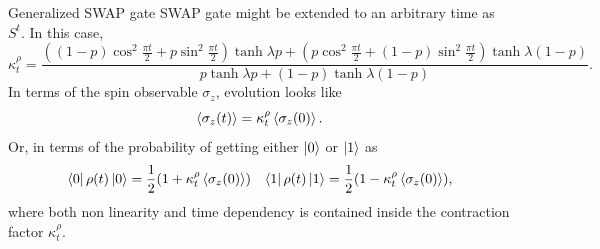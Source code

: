 \begin{frame}{Generalized SWAP gate}
    SWAP gate might be extended to an arbitrary time as $S^{t}$. In this case, 
    \begin{equation*}
        \kappa_{t}^{\rho}=\frac{((1-p)\cos^{2}{\frac{\pi t}{2}}+p\sin^{2}{\frac{\pi t}{2}})\tanh{\lambda p}+(p\cos^{2}{\frac{\pi t}{2}}+(1-p)\sin^{2}{\frac{\pi t}{2}})\tanh{\lambda (1-p)}}{
          p\tanh{\lambda p}+(1-p)\tanh{\lambda (1-p)}}.
      \end{equation*}
      In terms of the spin observable $\sigma_{z}$, evolution looks like
\begin{equation}
  \expval{\sigma_{z}(t)}=\kappa_{t}^{\rho}\expval{\sigma_{z}(0)}.
\end{equation}
Or, in terms of the probability of getting either $\ket{0}$ or $\ket{1}$ as
 \begin{align}
  \bra{0}\rho(t)\ket{0}=\frac{1}{2}(1+\kappa_{t}^{\rho}\expval{\sigma_{z}(0)}) && \bra{1}\rho(t)\ket{1}=\frac{1}{2}(1-\kappa_{t}^{\rho}\expval{\sigma_{z}(0)}),
 \end{align}
 where both non linearity and time dependency is contained inside the contraction factor $\kappa_{t}^{\rho}$. 
\end{frame}
